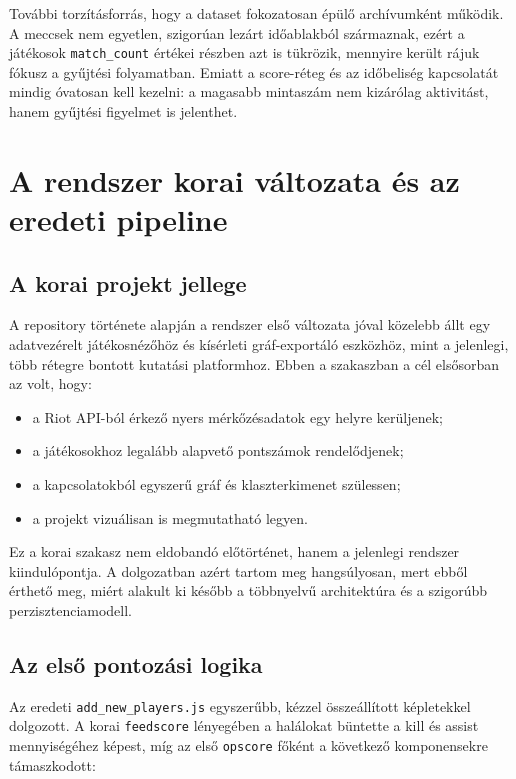 \documentclass[a4paper,12pt]{report}
\begin{document}
További torzításforrás, hogy a dataset fokozatosan épülő archívumként működik. A meccsek nem egyetlen, szigorúan lezárt időablakból származnak, ezért a játékosok \texttt{match\_count} értékei részben azt is tükrözik, mennyire került rájuk fókusz a gyűjtési folyamatban. Emiatt a score-réteg és az időbeliség kapcsolatát mindig óvatosan kell kezelni: a magasabb mintaszám nem kizárólag aktivitást, hanem gyűjtési figyelmet is jelenthet.

\chapter{A rendszer korai változata és az eredeti pipeline}

\section{A korai projekt jellege}

A repository története alapján a rendszer első változata jóval közelebb állt egy adatvezérelt játékosnézőhöz és kísérleti gráf-exportáló eszközhöz, mint a jelenlegi, több rétegre bontott kutatási platformhoz. Ebben a szakaszban a cél elsősorban az volt, hogy:

\begin{itemize}
    \item a Riot API-ból érkező nyers mérkőzésadatok egy helyre kerüljenek;
    \item a játékosokhoz legalább alapvető pontszámok rendelődjenek;
    \item a kapcsolatokból egyszerű gráf és klaszterkimenet szülessen;
    \item a projekt vizuálisan is megmutatható legyen.
\end{itemize}

Ez a korai szakasz nem eldobandó előtörténet, hanem a jelenlegi rendszer kiindulópontja. A dolgozatban azért tartom meg hangsúlyosan, mert ebből érthető meg, miért alakult ki később a többnyelvű architektúra és a szigorúbb perzisztenciamodell.

\section{Az első pontozási logika}

Az eredeti \texttt{add\_new\_players.js} egyszerűbb, kézzel összeállított képletekkel dolgozott. A korai \texttt{feedscore} lényegében a halálokat büntette a kill és assist mennyiségéhez képest, míg az első \texttt{opscore} főként a következő komponensekre támaszkodott:
\end{document}
